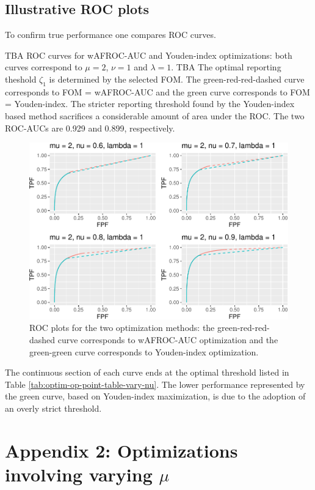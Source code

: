 \documentclass[
]{book}
\begin{document}
\hypertarget{illustrative-roc-plots}{%
\subsection{Illustrative ROC plots}\label{illustrative-roc-plots}}

To confirm true performance one compares ROC curves.

TBA ROC curves for wAFROC-AUC and Youden-index optimizations: both curves correspond to \(\mu = 2\), \(\nu = 1\) and \(\lambda = 1\). TBA The optimal reporting theshold \(\zeta_1\) is determined by the selected FOM. The green-red-red-dashed curve corresponds to FOM = wAFROC-AUC and the green curve corresponds to FOM = Youden-index. The stricter reporting threshold found by the Youden-index based method sacrifices a considerable amount of area under the ROC. The two ROC-AUCs are 0.929 and 0.899, respectively.

\begin{figure}
\centering
\includegraphics{21-optim-op-point_files/figure-latex/optim-op-point-vary-nu-roc-1.pdf}
\caption{\label{fig:optim-op-point-vary-nu-roc}ROC plots for the two optimization methods: the green-red-red-dashed curve corresponds to wAFROC-AUC optimization and the green-green curve corresponds to Youden-index optimization.}
\end{figure}

The continuous section of each curve ends at the optimal threshold listed in Table \ref{tab:optim-op-point-table-vary-nu}. The lower performance represented by the green curve, based on Youden-index maximization, is due to the adoption of an overly strict threshold.

\hypertarget{optim-op-point-vary-mu}{%
\section{\texorpdfstring{Appendix 2: Optimizations involving varying \(\mu\)}{Appendix 2: Optimizations involving varying \textbackslash mu}}\label{optim-op-point-vary-mu}}
\end{document}
